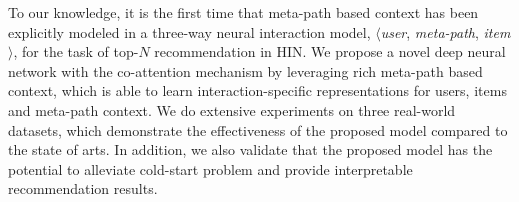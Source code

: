 
To our knowledge, it is the first time that  meta-path based context has been explicitly modeled in a three-way neural interaction model, \ie $\langle$\emph{user}, \emph{meta-path}, \emph{item}$\rangle$, for the task of top-$N$ recommendation in HIN.
We propose a novel deep neural network with the co-attention mechanism by leveraging rich meta-path based context, which is able to learn interaction-specific representations for users, items and meta-path context.
We do extensive experiments on three real-world datasets, which demonstrate the effectiveness of the proposed model compared to the state of arts.
In addition, we also validate that the proposed model has the potential to alleviate cold-start problem and provide interpretable recommendation results.



